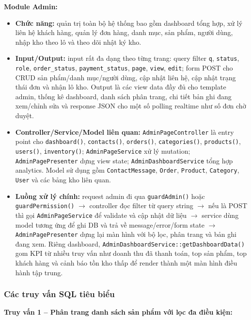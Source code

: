 \documentclass[a4paper]{article}
\begin{document}
\textbf{Module Admin:}
\begin{itemize}
    \item \textbf{Chức năng:} quản trị toàn bộ hệ thống bao gồm dashboard tổng hợp, xử lý liên hệ khách hàng, quản lý đơn hàng, danh mục, sản phẩm, người dùng, nhập kho theo lô và theo dõi nhật ký kho.
    \item \textbf{Input/Output:} input rất đa dạng theo từng trang: query filter \texttt{q}, \texttt{status}, \texttt{role}, \texttt{order\_status}, \texttt{payment\_status}, \texttt{page}, \texttt{view}, \texttt{edit}; form POST cho CRUD sản phẩm/danh mục/người dùng, cập nhật liên hệ, cập nhật trạng thái đơn và nhận lô kho. Output là các view data đầy đủ cho template admin, thống kê dashboard, danh sách phân trang, chi tiết bản ghi đang xem/chỉnh sửa và response JSON cho một số polling realtime như số đơn chờ duyệt.
    \item \textbf{Controller/Service/Model liên quan:} \texttt{AdminPageController} là entry point cho \texttt{dashboard()}, \texttt{contacts()}, \texttt{orders()}, \texttt{categories()}, \texttt{products()}, \texttt{users()}, \texttt{inventory()}; \texttt{AdminPageService} xử lý mutation; \texttt{AdminPagePresenter} dựng view state; \texttt{AdminDashboardService} tổng hợp analytics. Model sử dụng gồm \texttt{ContactMessage}, \texttt{Order}, \texttt{Product}, \texttt{Category}, \texttt{User} và các bảng kho liên quan.
    \item \textbf{Luồng xử lý chính:} request admin đi qua \texttt{guardAdmin()} hoặc \texttt{guardPermission()} $\to$ controller đọc filter từ query string $\to$ nếu là POST thì gọi \texttt{AdminPageService} để validate và cập nhật dữ liệu $\to$ service dùng model tương ứng để ghi DB và trả về message/error/form state $\to$ \texttt{AdminPagePresenter} dựng lại màn hình với bộ lọc, phân trang và bản ghi đang xem. Riêng dashboard, \texttt{AdminDashboardService::getDashboardData()} gom KPI từ nhiều truy vấn như doanh thu đã thanh toán, top sản phẩm, top khách hàng và cảnh báo tồn kho thấp để render thành một màn hình điều hành tập trung.
\end{itemize}

\subsubsection{Các truy vấn SQL tiêu biểu}

\textbf{Truy vấn 1 -- Phân trang danh sách sản phẩm với lọc đa điều kiện:}
\end{document}
